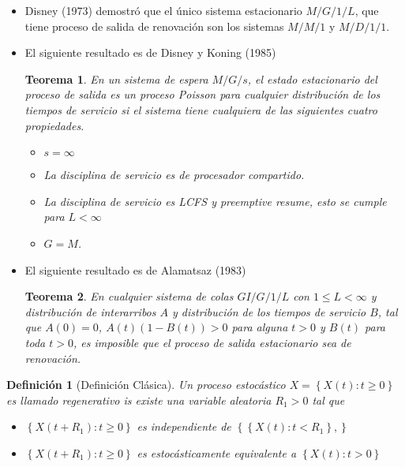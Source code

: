 \documentclass{article}
\newtheorem{Def}{Definición}[section]
\newtheorem{Teo}{Teorema}[section]
\numberwithin{equation}{section}
\begin{document}
{\begin{itemize}
\item Disney (1973) demostr\'o que el \'unico sistema estacionario $M/G/1/L$, que tiene proceso de salida de renovaci\'on  son los sistemas $M/M/1$ y $M/D/1/1$.



\item El siguiente resultado es de Disney y Koning (1985)
\begin{Teo}
En un sistema de espera $M/G/s$, el estado estacionario del proceso de salida es un proceso Poisson para cualquier distribuci\'on de los tiempos de servicio si el sistema tiene cualquiera de las siguientes cuatro propiedades.

\begin{itemize}
\item[a)] $s=\infty$
\item[b)] La disciplina de servicio es de procesador compartido.
\item[c)] La disciplina de servicio es LCFS y preemptive resume, esto se cumple para $L<\infty$
\item[d)] $G=M$.
\end{itemize}

\end{Teo}

\item El siguiente resultado es de Alamatsaz (1983)

\begin{Teo}
En cualquier sistema de colas $GI/G/1/L$ con $1\leq L<\infty$ y distribuci\'on de interarribos $A$ y distribuci\'on de los tiempos de servicio $B$, tal que $A\left(0\right)=0$, $A\left(t\right)\left(1-B\left(t\right)\right)>0$ para alguna $t>0$ y $B\left(t\right)$ para toda $t>0$, es imposible que el proceso de salida estacionario sea de renovaci\'on.
\end{Teo}

\end{itemize}





\begin{Def}[Definici\'on Cl\'asica]
Un proceso estoc\'astico $X=\left\{X\left(t\right):t\geq0\right\}$ es llamado regenerativo is existe una variable aleatoria $R_{1}>0$ tal que
\begin{itemize}
\item[i)] $\left\{X\left(t+R_{1}\right):t\geq0\right\}$ es independiente de $\left\{\left\{X\left(t\right):t<R_{1}\right\},\right\}$
\item[ii)] $\left\{X\left(t+R_{1}\right):t\geq0\right\}$ es estoc\'asticamente equivalente a $\left\{X\left(t\right):t>0\right\}$
\end{itemize}


\end{Def}}
\end{document}
